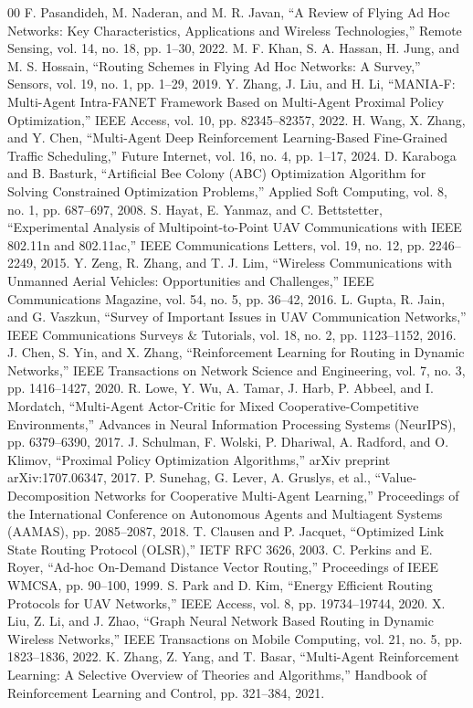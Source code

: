 \documentclass[conference]{IEEEtran}
\begin{document}
\begin{thebibliography}{00}
 F. Pasandideh, M. Naderan, and M. R. Javan, ``A Review of Flying Ad Hoc Networks: Key Characteristics, Applications and Wireless Technologies,'' Remote Sensing, vol. 14, no. 18, pp. 1--30, 2022.
 M. F. Khan, S. A. Hassan, H. Jung, and M. S. Hossain, ``Routing Schemes in Flying Ad Hoc Networks: A Survey,'' Sensors, vol. 19, no. 1, pp. 1--29, 2019.
 Y. Zhang, J. Liu, and H. Li, ``MANIA-F: Multi-Agent Intra-FANET Framework Based on Multi-Agent Proximal Policy Optimization,'' IEEE Access, vol. 10, pp. 82345--82357, 2022.
 H. Wang, X. Zhang, and Y. Chen, ``Multi-Agent Deep Reinforcement Learning-Based Fine-Grained Traffic Scheduling,'' Future Internet, vol. 16, no. 4, pp. 1--17, 2024.
 D. Karaboga and B. Basturk, ``Artificial Bee Colony (ABC) Optimization Algorithm for Solving Constrained Optimization Problems,'' Applied Soft Computing, vol. 8, no. 1, pp. 687--697, 2008.
 S. Hayat, E. Yanmaz, and C. Bettstetter, ``Experimental Analysis of Multipoint-to-Point UAV Communications with IEEE 802.11n and 802.11ac,'' IEEE Communications Letters, vol. 19, no. 12, pp. 2246--2249, 2015.
 Y. Zeng, R. Zhang, and T. J. Lim, ``Wireless Communications with Unmanned Aerial Vehicles: Opportunities and Challenges,'' IEEE Communications Magazine, vol. 54, no. 5, pp. 36--42, 2016.
 L. Gupta, R. Jain, and G. Vaszkun, ``Survey of Important Issues in UAV Communication Networks,'' IEEE Communications Surveys \& Tutorials, vol. 18, no. 2, pp. 1123--1152, 2016.
 J. Chen, S. Yin, and X. Zhang, ``Reinforcement Learning for Routing in Dynamic Networks,'' IEEE Transactions on Network Science and Engineering, vol. 7, no. 3, pp. 1416--1427, 2020.
 R. Lowe, Y. Wu, A. Tamar, J. Harb, P. Abbeel, and I. Mordatch, ``Multi-Agent Actor-Critic for Mixed Cooperative-Competitive Environments,'' Advances in Neural Information Processing Systems (NeurIPS), pp. 6379--6390, 2017.
 J. Schulman, F. Wolski, P. Dhariwal, A. Radford, and O. Klimov, ``Proximal Policy Optimization Algorithms,'' arXiv preprint arXiv:1707.06347, 2017.
 P. Sunehag, G. Lever, A. Gruslys, et al., ``Value-Decomposition Networks for Cooperative Multi-Agent Learning,'' Proceedings of the International Conference on Autonomous Agents and Multiagent Systems (AAMAS), pp. 2085--2087, 2018.
 T. Clausen and P. Jacquet, ``Optimized Link State Routing Protocol (OLSR),'' IETF RFC 3626, 2003.
 C. Perkins and E. Royer, ``Ad-hoc On-Demand Distance Vector Routing,'' Proceedings of IEEE WMCSA, pp. 90--100, 1999.
 S. Park and D. Kim, ``Energy Efficient Routing Protocols for UAV Networks,'' IEEE Access, vol. 8, pp. 19734--19744, 2020.
 X. Liu, Z. Li, and J. Zhao, ``Graph Neural Network Based Routing in Dynamic Wireless Networks,'' IEEE Transactions on Mobile Computing, vol. 21, no. 5, pp. 1823--1836, 2022.
 K. Zhang, Z. Yang, and T. Basar, ``Multi-Agent Reinforcement Learning: A Selective Overview of Theories and Algorithms,'' Handbook of Reinforcement Learning and Control, pp. 321--384, 2021.
\end{thebibliography}
\end{document}
